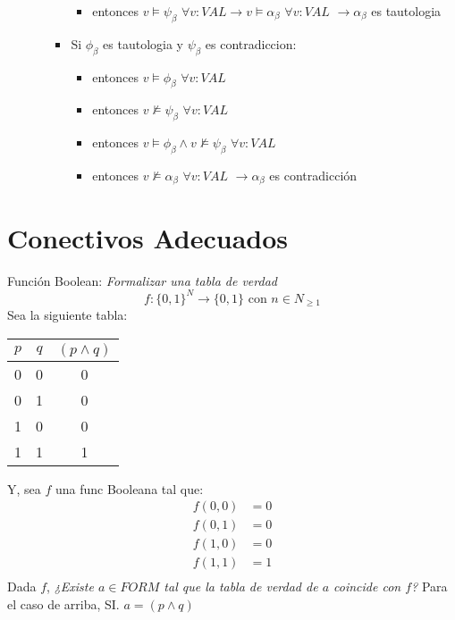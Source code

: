 \documentclass[14pt,a4paper,fleqn]{article}
\newcommand{\entonces}{\rightarrow}
\newcommand{\satisface}{\vDash}
\newcommand{\nosatisf}{\nvDash}
\newcommand{\conj}[2]{(#1 \wedge #2)}
\begin{document}
\begin{itemize}
\begin{itemize}
\begin{itemize}
\begin{itemize}
				 \item entonces $v \satisface \psi_{\beta}$ $\forall v: VAL \entonces v \satisface \alpha_{\beta}$ $\forall v:VAL$ $ \entonces  \alpha_{\beta}$ es tautologia 
			\end{itemize}
			\item Si $\phi_{\beta}$ es tautologia y $\psi_{\beta}$ es contradiccion:
			\begin{itemize}
				 \item entonces $v \satisface \phi_{\beta}$ $\forall v: VAL $
				 \item entonces $v \nosatisf \psi_{\beta}$ $\forall v: VAL $				 
 				 \item entonces $v \satisface \phi_{\beta} \wedge v \nosatisf \psi_{\beta}$ $\forall v: VAL $
				 \item entonces $v \nosatisf \alpha_{\beta}$ $\forall v:VAL$ $ \entonces \alpha_{\beta}$ es contradicción
			\end{itemize}			
		\end{itemize}
	\end{itemize}
\end{itemize}

\section*{Conectivos Adecuados}
Función Boolean: \textit{Formalizar una tabla de verdad}
\begin{equation*}
	f:\{0,1\}^N \entonces \{0,1\} \text{ con } n \in N_{\geqslant 1}
\end{equation*}
Sea la siguiente tabla:\\
\begin{center}
\begin{tabular}{c|c|c}

$p$ &$q$ & $\conj p q$ \\
\hline
0 & 0 & 0 \\
0 & 1 & 0 \\
1 & 0 & 0 \\
1 & 1 & 1 \\

\end{tabular}
\end{center}
Y, sea $f$ una func Booleana tal que:
\begin{align*}
	f(0,0) &= 0 \\
	f(0,1) &= 0 \\
	f(1,0) &= 0 \\
	f(1,1) &= 1 \\		
\end{align*}
Dada $f$, \emph{¿Existe $a \in FORM$ tal que la tabla de verdad de $a$ coincide con $f$?}
Para el caso de arriba, SI. $a=\conj p q$
\end{document}
